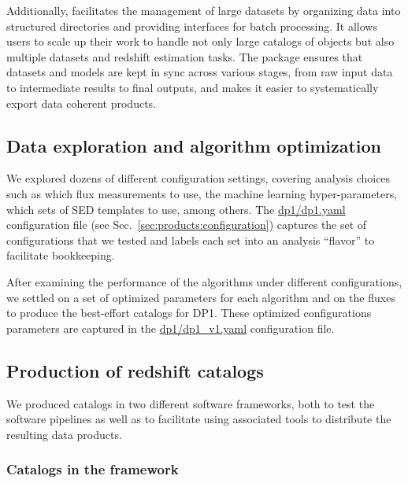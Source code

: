 Additionally,  facilitates the management of large datasets by organizing data into structured directories and providing interfaces for batch processing.  It allows users to scale up their work to handle not only large catalogs of objects but also multiple datasets and redshift estimation tasks.  The package ensures that datasets and models are kept in sync across various stages, from raw input data to intermediate results to final outputs, and makes it easier to systematically export data coherent products.

\subsection{Data exploration and algorithm optimization}
\label{sec:method:optimization}

We explored dozens of different configuration settings, covering analysis choices such as which flux measurements to use, the machine learning hyper-parameters, which sets of SED templates to use, among others.   The \href{https://github.com/LSSTDESC/rail_project_config/blob/main/dp1/dp1.yaml}{dp1/dp1.yaml} configuration file (see Sec.~\ref{sec:products:configuration}) captures the set of configurations that we tested and labels each set into an analysis ``flavor'' to facilitate bookkeeping. 

After examining the performance of the algorithms under different configurations, we settled on a set of optimized parameters for each algorithm and on the  fluxes to produce the best-effort catalogs for DP1.   These optimized configurations parameters are captured in the \href{https://github.com/LSSTDESC/rail_project_config/blob/main/dp1/dp1.yaml}{dp1/dp1\_v1.yaml} configuration file.


\subsection{Production of redshift catalogs}
\label{sec:method:redshift_catalogs}

We produced \photoz catalogs in two different software frameworks, both to test the software pipelines as well as to facilitate using associated tools to distribute the resulting data products. 


\subsubsection{Catalogs in the  framework}
\label{sec:method:redshift_catalogs:rail}

